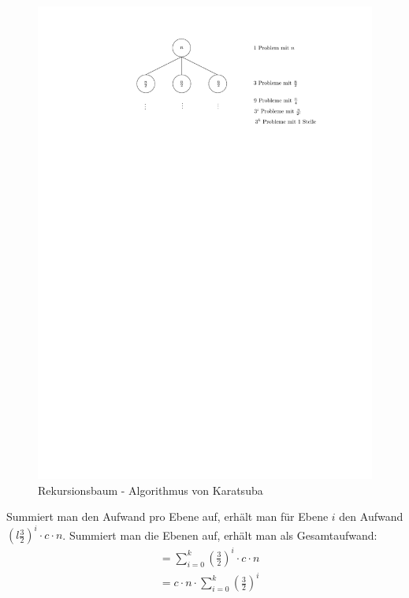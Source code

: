 \begin{figure}[h]
    \begin{center}
        \includegraphics[width=12cm]{../GFX/vl4_fig_5.pdf}
        \caption{Rekursionsbaum - Algorithmus von Karatsuba}
        \label{fig:karatsuba}
    \end{center}
\end{figure}

Summiert man den Aufwand pro Ebene auf, erhält man für Ebene $i$ den Aufwand $(l\frac{3}{2})^i \cdot c \cdot n$. Summiert man die Ebenen auf, erhält man als Gesamtaufwand:\\
\begin{align*}
    &=\sum\limits_{i=0}^k \left(\frac{3}{2}\right)^i \cdot c \cdot n\\
    &=c\cdot n\cdot\sum\limits_{i=0}^k \left(\frac{3}{2}\right)^i\\
\end{align*}

